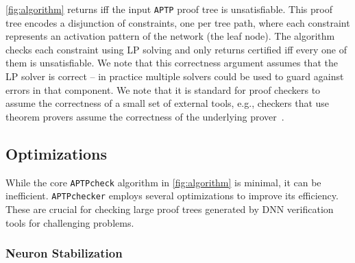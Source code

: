 \documentclass[oneside,11pt,dvipsnames]{book}
\newcommand{\nnproofcheck}{\texttt{APTPcheck}}
\newcommand{\nnproofchecker}{\texttt{APTPchecker}}
\newcommand{\nnproofformat}{\texttt{APTP}}
\begin{document}
 \autoref{fig:algorithm} returns \certified iff the input \nnproofformat{} proof tree is unsatisfiable. This proof tree encodes a disjunction of constraints, one per tree path, where each constraint represents an activation pattern of the network (the leaf node). The algorithm checks each constraint using LP solving and only returns certified iff every one of them is unsatisfiable.  
We note that this correctness argument assumes that the LP solver is correct -- in practice
multiple solvers could be used to guard against errors in that component.  We note that
it is standard for proof checkers to assume the correctness of a small set of external tools, e.g., checkers that use  theorem provers assume the correctness of the underlying prover~\cite{lammich2023grat}.

\subsection{Optimizations}
While the core \nnproofcheck{} algorithm in \autoref{fig:algorithm} is minimal, it can be inefficient. \nnproofchecker{} employs several optimizations to improve its efficiency. These are crucial for checking large proof trees generated by DNN verification tools for challenging problems.


\subsubsection{Neuron Stabilization}\label{sec:neuron-stabelization} 
\end{document}
